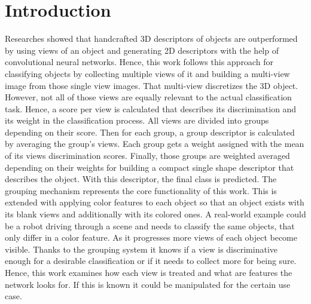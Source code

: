 \chapter{Introduction}
\label{sec:introduction}
%
%
Researches showed that handcrafted 3D descriptors of objects are outperformed by using views of an object and generating 2D descriptors with the help of convolutional neural networks.
Hence, this work follows this approach for classifying objects by collecting multiple views of it and building a multi-view image from those single view images.
That multi-view discretizes the 3D object. 
However, not all of those views are equally relevant to the actual classification task.
Hence, a score per view is calculated that describes its discrimination and its weight in the classification process.
All views are divided into groups depending on their score.
Then for each group, a group descriptor is calculated by averaging the group's views.
Each group gets a weight assigned with the mean of its views discrimination scores.
Finally, those groups are weighted averaged depending on their weights for building a compact single shape descriptor that describes the object.
With this descriptor, the final class is predicted.
The grouping mechanism represents the core functionality of this work.
This is extended with applying color features to each object so that an object exists with its blank views and additionally with its colored ones.
A real-world example could be a robot driving through a scene and needs to classify the same objects, that only differ in a color feature.
As it progresses more views of each object become visible.
Thanks to the grouping system it knows if a view is discriminative enough for a desirable classification or if it needs to collect more for being sure.
Hence, this work examines how each view is treated and what are features the network looks for.
If this is known it could be manipulated for the certain use case.


